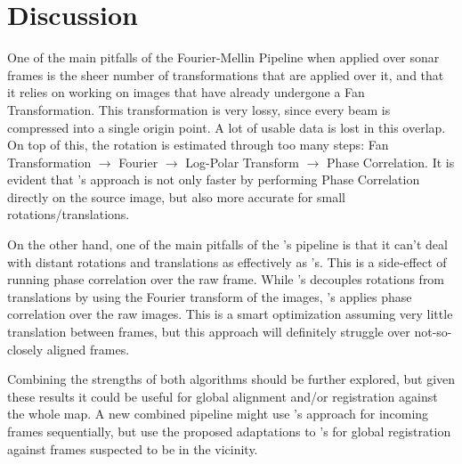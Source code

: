 \chapter{Discussion}
\label{chap:discussion}




One of the main pitfalls of the Fourier-Mellin Pipeline when applied over sonar frames is the sheer number of transformations that are applied over it, and that it relies on working on images that have already undergone a Fan Transformation. This transformation is very lossy, since every beam is compressed into a single origin point. A lot of usable data is lost in this overlap. On top of this, the rotation is estimated through too many steps: Fan Transformation $\rightarrow$ Fourier $\rightarrow$ Log-Polar Transform $\rightarrow$ Phase Correlation. It is evident that \citeauthor{Hurtos2015}'s approach is not only faster by performing Phase Correlation directly on the source image, but also more accurate for small rotations/translations.


On the other hand, one of the main pitfalls of the \citeauthor{Hurtos2015}'s pipeline is that it can't deal with distant rotations and translations as effectively as \citeauthor{Reddy1996}'s. This is a side-effect of running phase correlation over the raw frame. While \citeauthor{Reddy1996}'s decouples rotations from translations by using the Fourier transform of the images, \citeauthor{Hurtos2015}'s applies phase correlation over the raw images. This is a smart optimization assuming very little translation between frames, but this approach will definitely struggle over not-so-closely aligned frames.

Combining the strengths of both algorithms should be further explored, but given these results it could be useful for global alignment and/or registration against the whole map. A new combined pipeline might use \citeauthor{Hurtos2015}'s approach for incoming frames sequentially, but use the proposed adaptations to \citeauthor{Reddy1996}'s for global registration against frames suspected to be in the vicinity.

